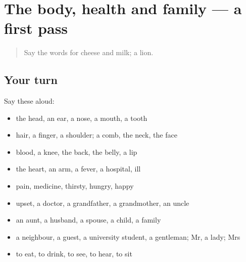 \section[(dialogue)]{The body, health and family — a first pass}

\label{lesson:FA-R44-first-pass-the-body-health-and-family}



\begin{quote}
Say the words for cheese and milk; a lion.
\end{quote}

\subsection*{Your turn}
Say these aloud:

\begin{itemize}
\raggedright
  \item the head, an ear, a nose, a mouth, a tooth
  \item hair, a finger, a shoulder; a comb, the neck, the face
  \item blood, a knee, the back, the belly, a lip
  \item the heart, an arm, a fever, a hospital, ill
  \item pain, medicine, thirsty, hungry, happy
  \item upset, a doctor, a grandfather, a grandmother, an uncle
  \item an aunt, a husband, a spouse, a child, a family
  \item a neighbour, a guest, a university student, a gentleman; Mr, a lady; Mrs
  \item to eat, to drink, to see, to hear, to sit
\end{itemize}

